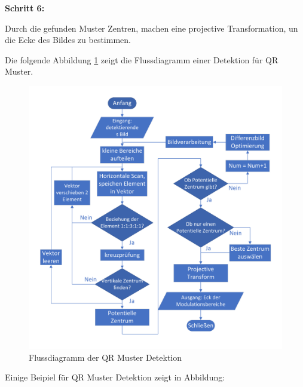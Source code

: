 \textbf{Schritt 6:}

Durch die gefunden Muster Zentren, machen eine projective Transformation, un die Ecke des Bildes zu bestimmen.


Die folgende Abbildung \ref{fig:FlussdiagrammQRMuster} zeigt die Flussdiagramm einer Detektion für QR Muster.

\begin{figure}[htb]
 \centering 
 \includegraphics[keepaspectratio,width=1.0\textwidth]{images/3_Ersteverfahren/QRMuster/QR_flussdiagramm.pdf}
 \caption{Flussdiagramm der QR Muster Detektion}
 \label{fig:FlussdiagrammQRMuster}
\end{figure}

Einige Beipiel für QR Muster Detektion zeigt in Abbildung:

